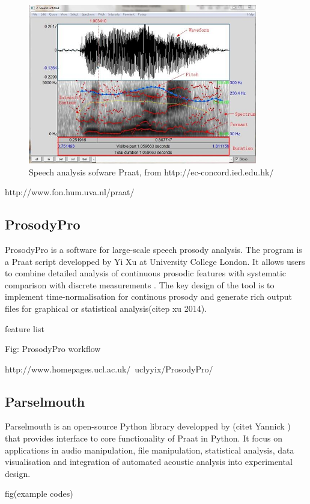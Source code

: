 \begin{figure}[ht]
\center
\includegraphics[width=10cm, scale=0.7]{figures/Praat.jpg}
\caption{Speech analysis sofware Praat, from http://ec-concord.ied.edu.hk/}
\label{fig:praat}
\end{figure}

http://www.fon.hum.uva.nl/praat/

\subsection{ProsodyPro}
ProsodyPro is a software for large-scale speech prosody analysis. The program is a Praat script developped by Yi Xu at University College London. It allows users to combine detailed analysis of continuous prosodic features with systematic comparison with discrete measurements . The key design of the tool is to implement time-normalisation for continous prosody and generate rich output files for graphical or statistical analysis(citep xu 2014).

feature list

Fig: ProsodyPro workflow

http://www.homepages.ucl.ac.uk/~uclyyix/ProsodyPro/

\subsection{Parselmouth}
Parselmouth is an open-source Python library developped by (citet Yannick ) that provides interface to core functionality of Praat in Python. It focus on applications in audio manipulation, file manipulation, statistical analysis, data visualisation and integration of automated acoustic analysis into experimental design.

fig(example codes)


